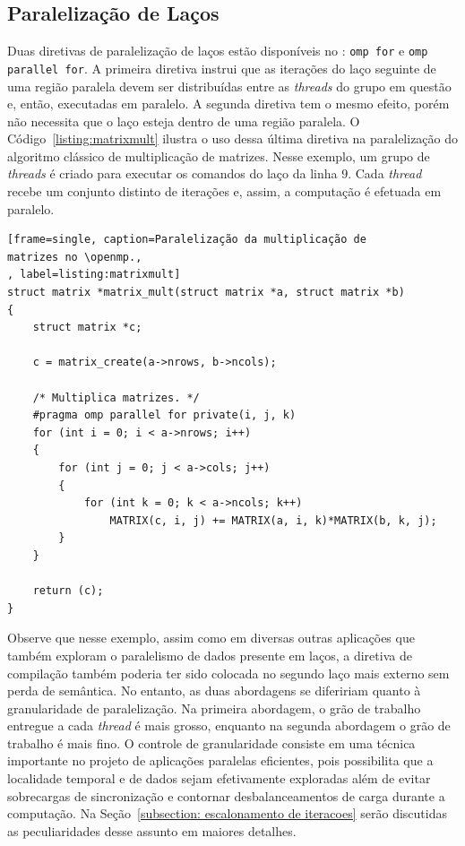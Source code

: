 \documentclass{SBCbookchapter}
\begin{document}
	\subsection{Paralelização de Laços}
	\label{subsection: paralelização de lacos}

		Duas diretivas de paralelização de laços estão disponíveis no
		\openmp: \texttt{omp for} e \texttt{omp parallel for}. A primeira
		diretiva instrui que as iterações do laço seguinte de uma região
		paralela devem ser distribuídas entre as \textit{threads} do grupo em questão
		e, então, executadas em paralelo. A segunda diretiva tem o mesmo
		efeito, porém não necessita que o laço esteja dentro de uma região
		paralela. O Código~\ref{listing:matrixmult} ilustra o uso dessa última
		diretiva na paralelização do algoritmo clássico de multiplicação de
		matrizes. Nesse exemplo, um grupo de \textit{threads} é criado para
		executar os comandos do laço da linha $9$. Cada \textit{thread}
		recebe um conjunto distinto de iterações e, assim, a
		computação é efetuada em paralelo. 

\begin{lstlisting}[frame=single, caption=Paralelização da multiplicação de
matrizes no \openmp.,
, label=listing:matrixmult]
struct matrix *matrix_mult(struct matrix *a, struct matrix *b)
{
	struct matrix *c;

	c = matrix_create(a->nrows, b->ncols);

	/* Multiplica matrizes. */
	#pragma omp parallel for private(i, j, k)
	for (int i = 0; i < a->nrows; i++)
	{
		for (int j = 0; j < a->cols; j++)
		{
			for (int k = 0; k < a->ncols; k++)
				MATRIX(c, i, j) += MATRIX(a, i, k)*MATRIX(b, k, j);
		}
	}

	return (c);
}
\end{lstlisting}

		Observe que nesse exemplo, assim como em diversas outras aplicações que
		também exploram o paralelismo de dados presente em laços, a diretiva de
		compilação também poderia ter sido colocada no segundo laço mais externo
		sem perda de semântica. No entanto, as duas abordagens se difeririam
		quanto à granularidade de paralelização. Na primeira abordagem, o grão
		de trabalho entregue a cada \textit{thread} é mais grosso, enquanto na segunda
		abordagem o grão de trabalho é mais fino. O controle de granularidade
		consiste em uma técnica importante no projeto de aplicações paralelas
		eficientes, pois possibilita que a localidade temporal e de dados sejam efetivamente
		exploradas além de evitar sobrecargas de sincronização e contornar desbalanceamentos
		de carga durante a computação. Na Seção~\ref{subsection: escalonamento de iteracoes}
		serão discutidas as peculiaridades desse assunto em maiores detalhes.
\end{document}
